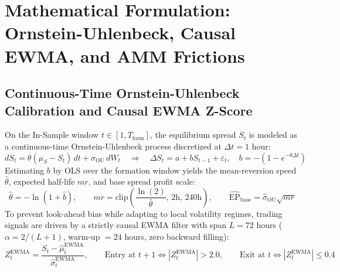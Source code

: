 \documentclass[11pt,a4paper]{article}
\begin{document}
\section{Mathematical Formulation: Ornstein-Uhlenbeck, Causal EWMA, and AMM Frictions}
\subsection{Continuous-Time Ornstein-Uhlenbeck Calibration and Causal EWMA Z-Score}
On the In-Sample window $t \in [1, T_{\text{form}}]$, the equilibrium spread $S_t$ is modeled as a continuous-time Ornstein-Uhlenbeck process discretized at $\Delta t = 1\text{ hour}$:
\begin{equation}
dS_t = \theta (\mu_S - S_t)\,dt + \sigma_{\text{OU}}\,dW_t \quad \Longrightarrow \quad \Delta S_t = a + b S_{t-1} + \varepsilon_t, \quad b = -(1 - e^{-\theta \Delta t})
\end{equation}
Estimating $b$ by OLS over the formation window yields the mean-reversion speed $\hat{\theta}$, expected half-life $mr$, and base spread profit scale:
\begin{equation}
\hat{\theta} = -\ln(1 + \hat{b}), \qquad mr = \text{clip}\!\left(\frac{\ln(2)}{\hat{\theta}},\, 2\text{h},\, 240\text{h}\right), \qquad \widehat{\text{EP}}_{\text{base}} = \hat{\sigma}_{\text{OU}} \sqrt{mr}
\end{equation}
To prevent look-ahead bias while adapting to local volatility regimes, trading signals are driven by a strictly causal EWMA filter with span $L = 72$ hours ($\alpha = 2/(L+1)$, warm-up $= 24$ hours, zero backward filling):
\begin{equation}
Z_t^{\text{EWMA}} = \frac{S_t - \hat{\mu}_t^{\text{EWMA}}}{\hat{\sigma}_t^{\text{EWMA}}}, \qquad \text{Entry at } t+1 \iff |Z_t^{\text{EWMA}}| > 2.0, \qquad \text{Exit at } t \iff |Z_t^{\text{EWMA}}| \le 0.4
\end{equation}
\end{document}
